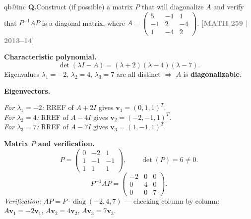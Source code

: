 \documentclass[12pt,a3paper]{article}
\makeatletter
\newcommand{\yr}[1]{\hfill\textcolor{gray}{\small\textbf{[#1]}}}
\newcounter{qnum}
\newcommand{\Q}[1]{%
  \csname qb@inc\endcsname
  \needspace{4\baselineskip}
  \refstepcounter{qnum}
  \vspace{6pt}
  \noindent\textbf{Q\theqnum.}\enspace #1\par
}
\makeatother
\begin{document}
\Q{Construct (if possible) a matrix $P$ that will diagonalize $A$ and verify that $P^{-1}AP$ is a diagonal matrix, where $A = \begin{pmatrix} 5 & -1 & 1 \\ -1 & 2 & -4 \\ 1 & -4 & 2 \end{pmatrix}$.
\yr{MATH 259 | 2013--14}}

\begin{tcolorbox}[enhanced,breakable,
  colback=cE!4,colframe=cE,boxrule=0.8pt,arc=5pt,
  title={\textbf{Answer --- Diagonalization of
    $A=\begin{pmatrix}5&-1&1\\-1&2&-4\\1&-4&2\end{pmatrix}$}},
  fonttitle=\bfseries\color{white},colbacktitle=cE]

\textbf{Characteristic polynomial.}
\[
  \det(\lambda I-A) = (\lambda+2)(\lambda-4)(\lambda-7).
\]
Eigenvalues $\lambda_1=-2$, $\lambda_2=4$, $\lambda_3=7$ are all distinct
$\Rightarrow$ $A$ is \textbf{diagonalizable}.

\medskip\textbf{Eigenvectors.}

\textit{For $\lambda_1=-2$:} RREF of $A+2I$ gives $\mathbf{v}_1=(0,1,1)^T$.\\
\textit{For $\lambda_2=4$:} RREF of $A-4I$ gives $\mathbf{v}_2=(-2,-1,1)^T$.\\
\textit{For $\lambda_3=7$:} RREF of $A-7I$ gives $\mathbf{v}_3=(1,-1,1)^T$.

\medskip\textbf{Matrix $P$ and verification.}
\[
  P=\begin{pmatrix}0&-2&1\\1&-1&-1\\1&1&1\end{pmatrix},\qquad
  \det(P)=6\neq0.
\]
\[
  \boxed{P^{-1}AP=\begin{pmatrix}-2&0&0\\0&4&0\\0&0&7\end{pmatrix}.}
\]
\textit{Verification:} $AP = P\cdot\operatorname{diag}(-2,4,7)$ — checking column by column:
$A\mathbf{v}_1=-2\mathbf{v}_1$, $A\mathbf{v}_2=4\mathbf{v}_2$, $A\mathbf{v}_3=7\mathbf{v}_3$.\;\checkmark

\end{tcolorbox}
\end{document}

